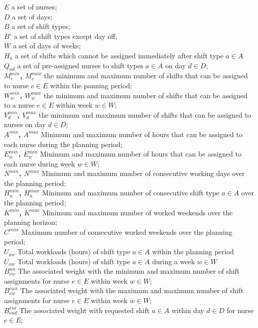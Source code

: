 \textbf{$E$} a set of nurses; \\
\textbf{$D$ } a set of days; \\
\textbf{$B$} a set of  shift types; \\
\textbf{$B'$} a set of shift types except day off; \\
\textbf{$W$} a set of days of weeks; \\
\textbf{$H_a$} a set of shifts which cannot be assigned immediately after shift type $a \in A$ \\
\textbf{$Q_{ad}$} a set of pre-assigned nurses to shift types $a \in A$ on day $d \in D$; \\
\textbf{$M_e^{min}$, $M_e^{max}$} the minimum and maximum number of shifts that can be assigned to nurse $e \in E$ within the panning period; \\
\textbf{$W_w^{min}$, $W_w^{max}$} the minimum and maximum number of shifts that can be assigned to a nurse $e \in E$ within week $w \in W$; \\
\textbf{$V_d^{min}$, $V_d^{max}$} the minimum and maximum number of shifts that can be assigned to nurses on day $d \in D$;\\
\textbf{$A^{min}$, $A^{max}$} Minimum and maximum number of hours that can  be assigned to each nurse during the planning period; \\
\textbf{$E_w^{min}$, $E_w^{min}$ }Minimum and maximum number of hours that can  be assigned to each nurse during week $w \in W$; \\
\textbf{$N^{min}$, $N^{max}$} Minimum and maximum number of consecutive  working days over the planning period; \\
\textbf{$H_a^{min}$, $H_a^{max}$} Minimum and maximum number of consecutive shift  type $a \in A$ over the planning period; \\
\textbf{$K^{min}$, $K^{max}$} Minimum and maximum number of worked  weekends over the planning horizon; \\
\textbf{$C^{max}$} Maximum number of consecutive worked weekends  over the planning period; \\
\textbf{$U_{aw}$} Total workloads (hours) of shift type $a \in A$ within the  planning period\\
\textbf{$U_{aw}$} Total workloads (hours) of shift type $a \in A$ during a week $w \in W$\\
\textbf{$B_{ew}^{wa}$} The associated weight with the minimum and  maximum number of shift assignments for nurse $e \in E$ within week $w \in W$; \\
\textbf{$B_{ew}^{cwx}$} The associated weight with the maximum and  maximum number of shift assignments for nurse $e \in E$ within week $w \in W$; \\
\textbf{$B_{ead}^{rso}$} The associated weight with requested shift $a \in A$ within day $d \in D$ for nurse $e \in E$;\\


